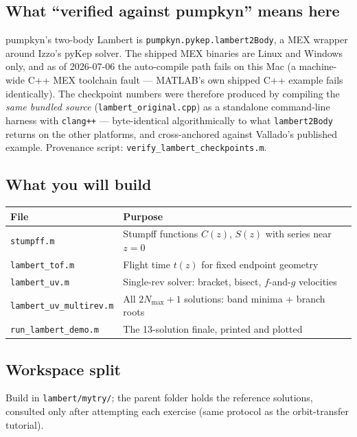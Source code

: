 \documentclass[11pt,letterpaper]{article}
\begin{document}
\subsection{What ``verified against pumpkyn'' means here}

pumpkyn's two-body Lambert is \texttt{pumpkyn.pykep.lambert2Body}, a MEX
wrapper around Izzo's pyKep solver. The shipped MEX binaries are Linux and
Windows only, and as of 2026-07-06 the auto-compile path fails on this
Mac (a machine-wide C++ MEX toolchain fault --- MATLAB's own shipped C++
example fails identically). The checkpoint numbers were therefore produced
by compiling the \emph{same bundled source}
(\texttt{lambert\_original.cpp}) as a standalone command-line harness with
\texttt{clang++} --- byte-identical algorithmically to what
\texttt{lambert2Body} returns on the other platforms, and cross-anchored
against Vallado's published example. Provenance script:
\texttt{verify\_lambert\_checkpoints.m}.

\subsection{What you will build}

\begin{center}
\begin{tabular}{lp{9.4cm}}
\toprule
File & Purpose \\
\midrule
\texttt{stumpff.m}             & Stumpff functions $C(z)$, $S(z)$ with series near $z=0$ \\
\texttt{lambert\_tof.m}        & Flight time $t(z)$ for fixed endpoint geometry \\
\texttt{lambert\_uv.m}         & Single-rev solver: bracket, bisect, $f$-and-$g$ velocities \\
\texttt{lambert\_uv\_multirev.m} & All $2N_{\max}{+}1$ solutions: band minima + branch roots \\
\texttt{run\_lambert\_demo.m}  & The 13-solution finale, printed and plotted \\
\bottomrule
\end{tabular}
\end{center}

\subsection{Workspace split}

Build in \texttt{lambert/mytry/}; the parent folder holds the reference
solutions, consulted only after attempting each exercise (same protocol as
the orbit-transfer tutorial).
\end{document}
